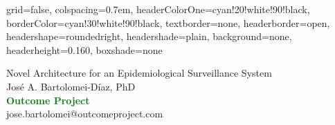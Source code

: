\documentclass[landscape,paperwidth=84in,paperheight=48in,fontscale=.199]{baposter}
\begin{document}
\begin{poster}{
 grid=false,
 colspacing=0.7em,
 headerColorOne=cyan!20!white!90!black,
 borderColor=cyan!30!white!90!black,
 textborder=none,
 headerborder=open,
 headershape=roundedright,
 headershade=plain,
 background=none,
 headerheight=0.160\textheight,
 boxshade=none
 }
 
 {\sc\Huge Novel Architecture for an Epidemiological Surveillance System}
 {\\[1em]
 {Jos\'e A. Bartolomei-D\'iaz, PhD\\
 \textbf{\textcolor{green}{Outcome Project\\}}
 jose.bartolomei@outcomeproject.com}}
 {
 
 }



\end{poster}
\end{document}

